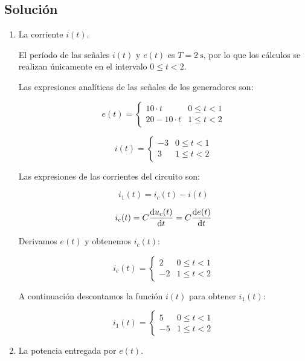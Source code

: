 \documentclass[10pt]{article}
\begin{document}
\subsection*{Solución}

\begin{enumerate}

\item La corriente $i(t)$.

  El período de las señales $i(t)$ y $e(t)$ es $T = \SI{2}{\second}$, por lo que los cálculos se realizan únicamente en el intervalo $0 \leq t < 2$.

Las expresiones analíticas de las señales de los generadores son:

\[
  e(t) = %
  \begin{cases}
    10\cdot t & 0 \leq t < 1\\
    20 - 10 \cdot t & 1 \leq t < 2 
  \end{cases}
\]

\[
  i(t) = %
  \begin{cases}
    -3 & 0 \leq t < 1\\
    3 & 1 \leq t < 2 
  \end{cases}
\]

Las expresiones de las corrientes del circuito son:

\[
  i_1(t) = i_c(t) - i(t)
\]

\[
  i_c(t) = C \diff{u_c(t)}{t} = C \diff{e(t)}{t}
\]



Derivamos $e(t)$ y obtenemos $i_c(t)$:

\[
  i_c(t) = %
  \begin{cases}
    2 & 0 \leq t < 1\\
    -2 & 1 \leq t < 2 
  \end{cases}
\]

A continuación descontamos la función $i(t)$ para obtener $i_1(t)$:

\[
  i_1(t) = %
  \begin{cases}
    5 & 0 \leq t < 1\\
    -5 & 1 \leq t < 2 
  \end{cases}
\]

\item La potencia entregada por $e(t)$.


\end{enumerate}
\end{document}
